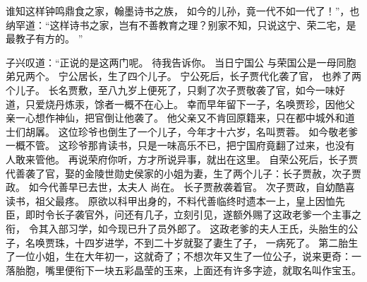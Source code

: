 谁知这样钟鸣鼎食之家，翰墨诗书之族，
如今的儿孙，竟一代不如一代了！”，也纳罕道：“这样诗书之家，岂有不善教育之理？别家不知，只说这宁、荣二宅，是最教子有方的。
”\par
子兴叹道：“正说的是这两门呢。
待我告诉你。
当日宁国公
与荣国公是一母同胞弟兄两个。
宁公居长，生了四个儿子。
宁公死后，长子贾代化袭了官，
也养了两个儿子。
长名贾敷，至八九岁上便死了，只剩了次子贾敬袭了官，如今一味好道，只爱烧丹炼汞，馀者一概不在心上。
幸而早年留下一子，名唤贾珍，因他父亲一心想作神仙，把官倒让他袭了。
他父亲又不肯回原籍来，只在都中城外和道士们胡羼。
这位珍爷也倒生了一个儿子，今年才十六岁，名叫贾蓉。
如今敬老爹一概不管。
这珍爷那肯读书，只是一味高乐不已，把宁国府竟翻了过来，也没有人敢来管他。
再说荣府你听，方才所说异事，就出在这里。
自荣公死后，长子贾代善袭了官，娶的金陵世勋史侯家的小姐为妻，生了两个儿子：长子贾赦，次子贾政。
如今代善早已去世，太夫人
尚在。
长子贾赦袭着官。
次子贾政，自幼酷喜读书，祖父最疼。
原欲以科甲出身的，不料代善临终时遗本一上，皇上因恤先臣，即时令长子袭官外，问还有几子，立刻引见，遂额外赐了这政老爹一个主事之衔，
令其入部习学，如今现已升了员外郎了。
这政老爹的夫人王氏，头胎生的公子，名唤贾珠，十四岁进学，不到二十岁就娶了妻生了子，
一病死了。
第二胎生了一位小姐，生在大年初一，这就奇了；不想次年又生了一位公子，说来更奇：一落胎胞，嘴里便衔下一块五彩晶莹的玉来，上面还有许多字迹，就取名叫作宝玉。
